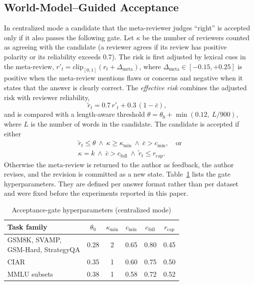 \subsection{World-Model--Guided Acceptance}
\label{sec:gate}

In centralized mode a candidate that the meta-reviewer judges ``right'' is accepted only if it also passes the following gate.
Let \(\kappa\) be the number of reviewers counted as agreeing with the candidate (a reviewer agrees if its review has positive polarity or its reliability exceeds 0.7).
The risk is first adjusted by lexical cues in the meta-review, \(r'_t = \mathrm{clip}_{[0,1]}(r_t + \Delta_{\mathrm{meta}})\), where \(\Delta_{\mathrm{meta}}\in[-0.15,+0.25]\) is positive when the meta-review mentions flaws or concerns and negative when it states that the answer is clearly correct.
The \emph{effective risk} combines the adjusted risk with reviewer reliability,
\begin{equation}
\tilde r_t = 0.7\, r'_t + 0.3\,(1-\bar c),
\end{equation}
and is compared with a length-aware threshold \(\theta = \theta_0 + \min(0.12,\ L/900)\), where \(L\) is the number of words in the candidate.
The candidate is accepted if either
\begin{align}
&\tilde r_t \le \theta \ \wedge\ \kappa \ge \kappa_{\min} \ \wedge\ \bar c > c_{\min}, \quad\text{or} \label{eq:gateA}\\
&\kappa = k \ \wedge\ \bar c > c_{\mathrm{full}} \ \wedge\ \tilde r_t \le r_{\mathrm{cap}}. \label{eq:gateB}
\end{align}
Otherwise the meta-review is returned to the author as feedback, the author revises, and the revision is committed as a new state.
Table~\ref{tab:hyper} lists the gate hyperparameters. They are defined per answer format rather than per dataset and were fixed before the experiments reported in this paper.

\begin{table}[!t]
\caption{Acceptance-gate hyperparameters (centralized mode)}
\label{tab:hyper}
\centering
\footnotesize
\setlength{\tabcolsep}{3pt}
\begin{tabular}{lccccc}
\toprule
Task family & $\theta_0$ & $\kappa_{\min}$ & $c_{\min}$ & $c_{\mathrm{full}}$ & $r_{\mathrm{cap}}$ \\
\midrule
\makecell[l]{GSM8K, SVAMP,\\GSM-Hard, StrategyQA} & 0.28 & 2 & 0.65 & 0.80 & 0.45 \\
CIAR & 0.35 & 1 & 0.60 & 0.75 & 0.50 \\
MMLU subsets & 0.38 & 1 & 0.58 & 0.72 & 0.52 \\
\bottomrule
\end{tabular}
\end{table}

